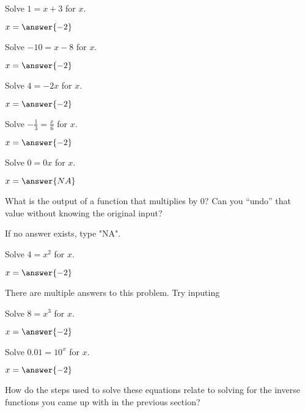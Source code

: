 \documentclass[number]{ximera}
\begin{document}
\begin{problem}
Solve $1=x+3$ for $x$.

$x=\answer{-2}$
\end{problem}

\begin{problem}
Solve $-10=x-8$ for $x$.

$x=\answer{-2}$
\end{problem}

\begin{problem}
Solve $4=-2x$ for $x$.

$x=\answer{-2}$
\end{problem}

\begin{problem}
Solve $-\frac{1}{3}=\frac{x}{6}$ for $x$.

$x=\answer{-2}$
\end{problem}

\begin{problem}
Solve $0=0x$ for $x$.

$x=\answer{NA}$
\begin{hint}
What is the output of a function that multiplies by 0? Can you ``undo'' that value without knowing the original input?
\end{hint}
\begin{hint}
If no answer exists, type "NA".
\end{hint}
\end{problem}

\begin{problem}
Solve $4=x^2$ for $x$.

$x=\answer{-2}$
\begin{hint}
There are multiple answers to this problem. Try inputing 
\end{hint}
\end{problem}

\begin{problem}
Solve $8=x^3$ for $x$.

$x=\answer{-2}$
\end{problem}

\begin{problem}
Solve $0.01=10^x$ for $x$.

$x=\answer{-2}$
\end{problem}

\begin{question}
How do the steps used to solve these equations relate to solving for the inverse functions you came up with in the previous section?
\begin{freeResponse}

\end{freeResponse}
\end{question}
\end{document}
